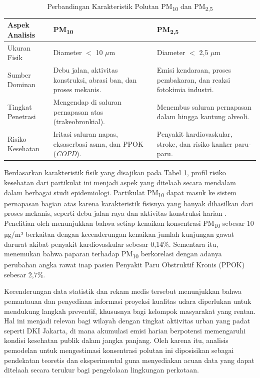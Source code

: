 \begin{table}[htbp]
\centering
\captionsetup{justification=centering}
\setlength{\tabcolsep}{6pt} 
\caption{Perbandingan Karakteristik Polutan PM\textsubscript{10} dan PM\textsubscript{2,5}}
\label{tbl:pm10vspm25}

\begin{tabularx}{\textwidth}{|>{\raggedright\arraybackslash}p{2.8cm}|
                              >{\raggedright\arraybackslash}X|
                              >{\raggedright\arraybackslash}X|}
\hline
\textbf{Aspek Analisis} & \textbf{PM\textsubscript{10}} & \textbf{PM\textsubscript{2,5}} \\
\hline
Ukuran Fisik & Diameter $<$ 10 $\mu$m & Diameter $<$ 2,5 $\mu$m \\
\hline
Sumber Dominan & Debu jalan, aktivitas konstruksi, abrasi ban, dan proses mekanis. & Emisi kendaraan, proses pembakaran, dan reaksi fotokimia industri. \\
\hline
Tingkat Penetrasi & Mengendap di saluran pernapasan atas (trakeobronkial). & Menembus saluran pernapasan dalam hingga kantung alveoli. \\
\hline
Risiko Kesehatan & Iritasi saluran napas, eksaserbasi asma, dan PPOK (\textit{COPD}). & Penyakit kardiovaskular, stroke, dan risiko kanker paru-paru. \\
\hline
\end{tabularx}
\end{table}

Berdasarkan karakteristik fisik yang disajikan pada Tabel \ref{tbl:pm10vspm25}, profil risiko kesehatan dari partikulat ini menjadi aspek yang ditelaah secara mendalam dalam berbagai studi epidemiologi. Partikulat PM\textsubscript{10} dapat masuk ke sistem pernapasan bagian atas karena karakteristik fisisnya yang banyak dihasilkan dari proses mekanis, seperti debu jalan raya dan aktivitas konstruksi harian \autocite{firdaus2023jakarta}. Penelitian oleh \textcite{zhang2021association} menunjukkan bahwa setiap kenaikan konsentrasi PM\textsubscript{10} sebesar 10 µg/m³ berkaitan dengan kecenderungan kenaikan jumlah kunjungan gawat darurat akibat penyakit kardiovaskular sebesar 0,14\%. Sementara itu, \textcite{kyung2020particulate} menemukan bahwa paparan terhadap PM\textsubscript{10} berkorelasi dengan adanya perubahan angka rawat inap pasien Penyakit Paru Obstruktif Kronis (PPOK) sebesar 2,7\%.

Kecenderungan data statistik dan rekam medis tersebut menunjukkan bahwa pemantauan dan penyediaan informasi proyeksi kualitas udara diperlukan untuk mendukung langkah preventif, khususnya bagi kelompok masyarakat yang rentan. Hal ini menjadi relevan bagi wilayah dengan tingkat aktivitas urban yang padat seperti DKI Jakarta, di mana akumulasi emisi harian berpotensi memengaruhi kondisi kesehatan publik dalam jangka panjang. Oleh karena itu, analisis pemodelan untuk mengestimasi konsentrasi polutan ini diposisikan sebagai pendekatan teoretis dan eksperimental guna menyediakan acuan data yang dapat ditelaah secara terukur bagi pengelolaan lingkungan perkotaan.


